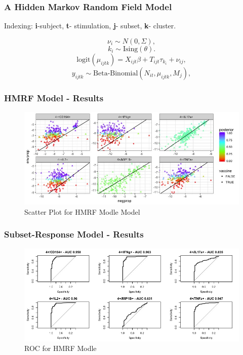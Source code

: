 \documentclass{beamer}
\theoremstyle{definition}
\begin{document}

\begin{frame}
\frametitle{A Hidden Markov Random Field Model}
\begin{framed}
Indexing: \textbf{i}-subject, \textbf{t}- stimulation, \textbf{j}- subset, \textbf{k}- cluster.
\end{framed}

$$
\nu_i \sim N(0, \Sigma),
$$$$
k_i \sim \text{Ising}(\theta).
$$$$
\text{logit}(\mu_{ijtk}) = X_{ijt} \beta + T_{ijt}\tau_{k_i} + \nu_{ij} ,
$$$$
y_{ijtk} \sim \text{Beta-Binomial}(N_{it}, \mu_{ijtk}, M_j) ,
$$
\end{frame}


\begin{frame}
\frametitle{HMRF Model - Results}
\begin{figure}[]
\includegraphics[width=11 cm]{figures/HMRFscatter} \caption{Scatter Plot for HMRF Modle Model}
\end{figure}
\end{frame}

\begin{frame}
\frametitle{Subset-Response Model - Results}
\begin{figure}[]
\includegraphics[width=11 cm]{figures/HMRFroc} \caption{ROC for HMRF Modle}
\end{figure}
\end{frame}
\end{document}
